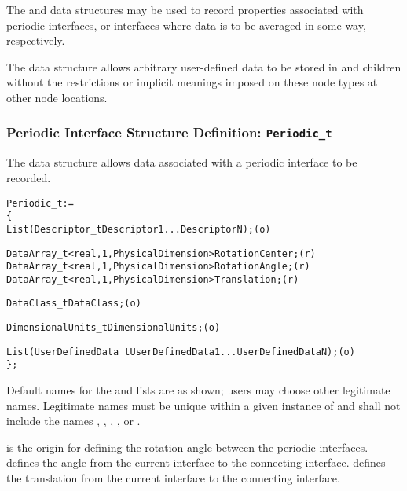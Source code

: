The  and  data structures
may be used to record properties associated with periodic interfaces, or
interfaces where data is to be averaged in some way, respectively.

The  data structure allows arbitrary
user-defined data to be stored in  and
 children without the restrictions or implicit
meanings imposed on these node types at other node locations.

\subsubsection{Periodic Interface Structure Definition: \texttt{Periodic\_t}}
\label{s:Periodic}

The  data structure allows data associated with
a periodic interface to be recorded.

\begin{alltt}
  Periodic\_t :=
    \{
    List( Descriptor\_t Descriptor1 ... DescriptorN ) ;                      (o)

    DataArray\_t<real, 1, PhysicalDimension> RotationCenter ;                (r)
    DataArray\_t<real, 1, PhysicalDimension> RotationAngle ;                 (r)
    DataArray\_t<real, 1, PhysicalDimension> Translation ;                   (r)

    DataClass\_t DataClass ;                                                 (o)

    DimensionalUnits\_t DimensionalUnits ;                                   (o)

    List( UserDefinedData\_t UserDefinedData1 ... UserDefinedDataN ) ;       (o)
    \} ;
\end{alltt}

\begin{notes}
\item
 Default names for the  and
  lists are as shown; users may choose other
 legitimate names.
 Legitimate names must be unique within a given instance of
  and shall not include the names ,
 , , ,
 or .
\end{notes}

 is the origin for defining the rotation angle
between the periodic interfaces.
 defines the angle from the current interface to
the connecting interface.
 defines the translation from the current interface
to the connecting interface.

